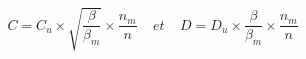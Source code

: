 \begin{equation}
C=C_u \times \sqrt{\frac{\beta}{\beta_m}}\times \frac{n_m}{n} \ \ \ \ \ et \ \ \ \ \ D=D_u\times \frac{\beta}{\beta_m} \times \frac{n_m}{n}
\end{equation}
